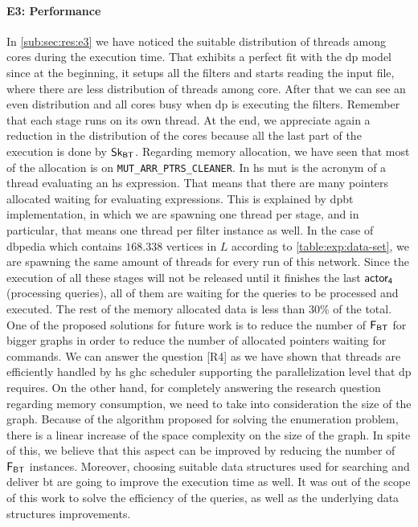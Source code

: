 \paragraph{E3: Performance} In \autoref{sub:sec:res:e3} we have noticed the suitable distribution of threads among cores during the execution time. 
That exhibits a perfect fit with the \acrshort{dp} model since at the beginning, it setups all the filters and starts reading the input file, where there are less distribution of threads among core. 
After that we can see an even distribution and all cores busy when \acrshort{dp} is executing the filters. Remember that each stage runs on its own thread. At the end, we appreciate again a reduction in the distribution of the cores because all the last part of the execution is done by $\mathsf{Sk_{BT}}$.
Regarding memory allocation, we have seen that most of the allocation is on \texttt{MUT\_ARR\_PTRS\_CLEANER}.
In \acrlong{hs} \acrshort{mut} is the acronym of a thread evaluating an \acrshort{hs} expression.
That means that there are many pointers allocated waiting for evaluating expressions. This is explained by \acrshort{dpbt} implementation, in which we are spawning one
thread per stage, and in particular, that means one thread per filter instance as well. In the case of \acrshort{dbpedia} which contains $168.338$ vertices in 
$L$ according to \autoref{table:exp:data-set}, we are spawning the same amount of threads for every run of this network. Since the execution of all these stages will not be released until it finishes the last $\mathsf{actor_4}$ (processing queries), all of them are waiting for the queries to be processed and executed.
The rest of the memory allocated data is less than $30\%$ of the total.
One of the proposed solutions for future work is to reduce the number of $\mathsf{F_{BT}}$ for bigger graphs in order to reduce the number of allocated pointers waiting for commands.
We can answer the question [R4] as we have shown that threads are efficiently handled by \acrshort{hs} \acrshort{ghc} scheduler supporting the parallelization level that \acrshort{dp} requires. 
On the other hand, for completely answering the research question regarding memory consumption, we need to take into consideration the size of the graph.
Because of the algorithm proposed for solving the enumeration problem, there is a linear increase of the space complexity on the size of the graph. In spite of this, we believe that this aspect can be improved by reducing the number of $\mathsf{F_{BT}}$ instances. Moreover, choosing suitable data structures used for searching and deliver \acrshort{bt} are going to improve the execution time as well. 
It was out of the scope of this work to solve the efficiency of the queries, as well as the underlying data structures improvements. 



